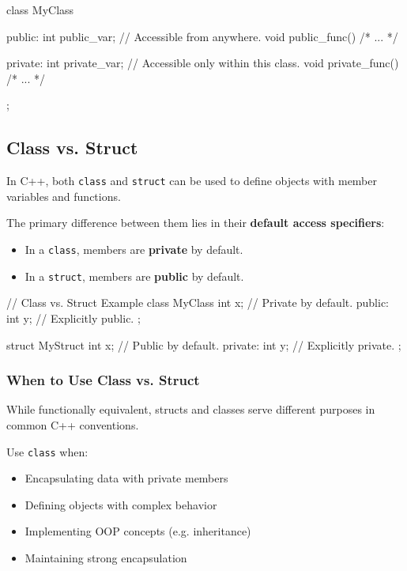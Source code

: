 \begin{codeblock}[language=C++, numbers=none]
class MyClass {
public:
    int public_var;      // Accessible from anywhere.
    void public_func() { /* ... */ }

private:
    int private_var;     // Accessible only within this class.
    void private_func() { /* ... */ }
};
\end{codeblock}

\subsection{Class vs. Struct}

In C++, both \texttt{class} and \texttt{struct} can be used to define objects with member variables and functions.

\vspace{0.5em}

The primary difference between them lies in their \textbf{default access specifiers}:

\begin{itemize}
    \item In a \texttt{class}, members are \textbf{private} by default.
    \item In a \texttt{struct}, members are \textbf{public} by default.
\end{itemize}

\begin{codeblock}[language=C++, numbers=none]
// Class vs. Struct Example
class MyClass {
    int x; // Private by default.
public:
    int y; // Explicitly public.
};

struct MyStruct {
    int x; // Public by default.
private:
    int y; // Explicitly private.
};
\end{codeblock}

\subsubsection{When to Use Class vs. Struct}

While functionally equivalent, structs and classes serve different purposes in common C++ conventions.

\vspace{0.5em}

Use \texttt{class} when:
\vspace{0.5em}
\begin{itemize}
    \item Encapsulating data with private members
    \item Defining objects with complex behavior
    \item Implementing OOP concepts (e.g. inheritance)
    \item Maintaining strong encapsulation
\end{itemize}

